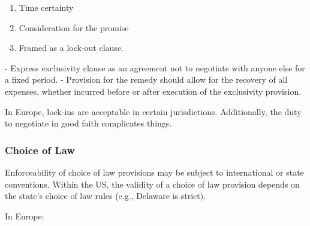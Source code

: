 \documentclass[
]{article}
\newenvironment{Shaded}{}{}
\newcommand{\NormalTok}[1]{#1}
\providecommand{\tightlist}{%
  \setlength{\itemsep}{0pt}\setlength{\parskip}{0pt}}
\begin{document}
\begin{enumerate}
\def\labelenumi{\arabic{enumi}.}
\tightlist
\item
  Time certainty
\item
  Consideration for the promise
\item
  Framed as a lock-out clause.
\end{enumerate}

\begin{Shaded}
\begin{Highlighting}[]
\NormalTok{{-} Express exclusivity clause as an agreement not to negotiate with anyone else for a fixed period. }
\NormalTok{{-} Provision for the remedy should allow for the recovery of all expenses, whether incurred before or after execution of the exclusivity provision.}
\end{Highlighting}
\end{Shaded}

In Europe, lock-ins are acceptable in certain jurisdictions.
Additionally, the duty to negotiate in good faith complicates things.

\hypertarget{choice-of-law}{%
\subsubsection{Choice of Law}\label{choice-of-law}}

Enforceability of choice of law provisions may be subject to
international or state conventions. Within the US, the validity of a
choice of law provision depends on the state's choice of law rules
(e.g., Delaware is strict).

In Europe:
\end{document}
